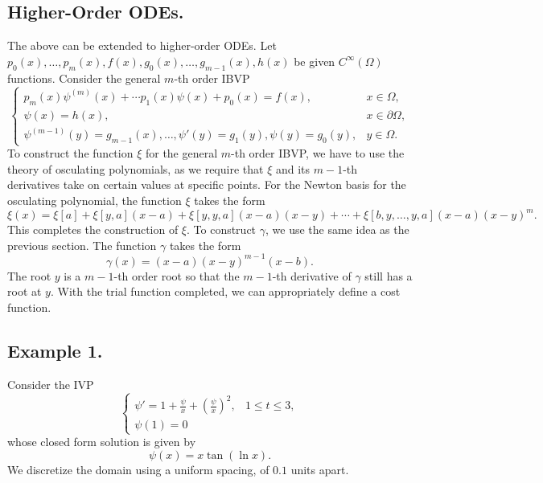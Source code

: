 \documentclass[10pt]{article}
\theoremstyle{plain}
\theoremstyle{definition}
\theoremstyle{remark}
\numberwithin{theorem}{section}
\numberwithin{proposition}{section}
\numberwithin{remark}{section}
\numberwithin{corollary}{section}
\numberwithin{definition}{section}
\numberwithin{lemma}{section}
\numberwithin{equation}{section}
\begin{document}
\subsection{Higher-Order ODEs.}
The above can be extended to higher-order ODEs. Let $p_0(x), \dots, p_m(x), f(x), g_0(x),\dots,g_{m-1}(x), h(x)$ be given $C^\infty(\Omega)$ functions. Consider the general $m$-th order IBVP
\begin{equation}
	\label{higher-order ODEs, m-th order IBVP}
	\displaystyle \begin{cases}
		p_m(x)\psi^{(m)}(x) + \cdots p_1(x)\psi(x) + p_0(x) = f(x), & x \in \Omega, \\
		\psi(x) = h(x), & x \in \partial \Omega, \\
		\psi^{(m-1)}(y) = g_{m-1}(x), \dots, \psi'(y) = g_1(y), \psi(y) = g_0(y), & y \in \Omega.
	\end{cases}
\end{equation} 
To construct the function $\xi$ for the general $m$-th order IBVP, we have to use the theory of osculating polynomials, as we require that $\xi$ and its $m-1$-th derivatives take on certain values at specific points. For the Newton basis for the osculating polynomial, the function $\xi$ takes the form
\begin{equation}
	\label{higher-order ODEs, form of the function xi}
	\displaystyle \xi(x) = \xi[a] + \xi[y,a](x-a) + \xi[y,y,a](x-a)(x-y) + \cdots + 	\xi[b,y,\dots,y,a](x-a)(x-y)^{m}.
\end{equation}
This completes the construction of $\xi$. To construct $\gamma$, we use the same idea as the previous section. The function $\gamma$ takes the form 
\begin{equation}
	\label{higher-order ODEs, form of the function gamma}
	\displaystyle \gamma(x) = (x-a)(x-y)^{m-1}(x-b).
\end{equation}
The root $y$ is a $m-1$-th order root so that the $m-1$-th derivative of $\gamma$ still has a root at $y$. With the trial function completed, we can appropriately define a cost function. 
\subsection{Example 1.}
Consider the IVP 
\begin{equation}
	\label{example 1, IVP}
	\displaystyle \begin{cases}
		\psi' = 1 + \tfrac{\psi}{x} + \left(\tfrac{\psi}{x}\right)^2, & 1 \leq t \leq 3, \\
		\psi(1) = 0
	\end{cases}
\end{equation}
whose closed form solution is given by 
\begin{equation}
	\label{example 1, closed form solution}
	\displaystyle \psi(x) = x\tan(\ln x).
\end{equation}
We discretize the domain using a uniform spacing, of $0.1$ units apart. 
\end{document}
